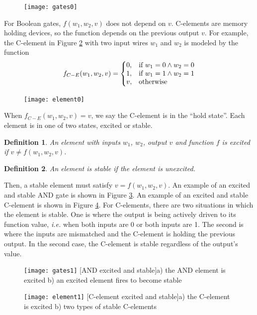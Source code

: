 \documentclass[12pt]{report}
\newtheorem*{definition}{Definition}
\begin{document}
\begin{figure}[h]
\centering
\texttt{[image: gates0]}
\label{fig:gates0}
\end{figure}

For Boolean gates, $f(w_1, w_2,v)$ does not depend on $v$.  
C-elements are memory holding devices, so the function depends on the previous output $v$.  For example, the C-element in Figure \ref{fig:element0} with two input wires $w_1$ and $w_2$ is modeled by the function
\[
f_{C-E}(w_1,w_2, v) =\left\{
  \begin{array}{@{}ll@{}}
    0, & \text{if}\ w_1=0 \wedge w_2=0\\
    1, & \text{if}\ w_1=1 \wedge w_2=1\\
    v, & \text{otherwise}

  \end{array}\right. 
\]

\begin{figure}[h]
\centering
\texttt{[image: element0]}
\label{fig:element0}
\end{figure}

When $f_{C-E}(w_1,w_2, v) =v$, we say the C-element is in the ``hold state''.  
Each element is in one of two states, excited or stable.  
\begin{definition}
An element with inputs $w_1$, $w_2$, output $v$ and function $f$ is {\em excited} if $v\neq f(w_1,w_2, v)$.  
\end{definition}

\begin{definition} 
An element is stable if the element is unexcited.
\end{definition}
Then, a stable element must satisfy $v= f(w_1,w_2,v)$.  An example of an excited and stable AND gate is shown in Figure \ref{fig:gates1}.  An example of an excited and stable C-element is shown in Figure \ref{fig:element1}.  For C-elements, there are two situations in which the element is stable.  One is where the output is being actively driven to its function value, {\em i.e.} when both inputs are 0 or both inputs are 1.  The second is where the inputs are mismatched and the C-element is holding the previous output.  In the second case, the C-element is stable regardless of the output's value.

\begin{figure}[h]
\centering
\texttt{[image: gates1]}
[AND excited and stable]{a) the AND element is excited  b) an excited element fires to become stable}
\label{fig:gates1}
\end{figure}
\begin{figure}[h]
\centering
\texttt{[image: element1]}
[C-element excited and stable]{a) the C-element is excited  b) two types of stable C-elements}
\label{fig:element1}
\end{figure}
\end{document}
